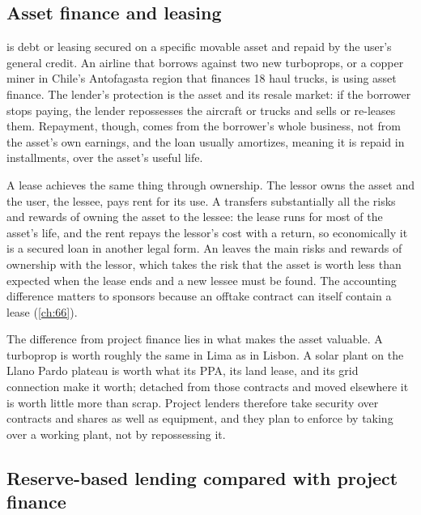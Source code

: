 \subsection{Asset finance and leasing}\label{ssec:2.4.2}

 is debt or leasing secured on a specific movable asset and repaid by the user's general credit. An airline that borrows against two new turboprops, or a copper miner in Chile's Antofagasta region that finances 18 haul trucks, is using asset finance. The lender's protection is the asset and its resale market: if the borrower stops paying, the lender repossesses the aircraft or trucks and sells or re-leases them. Repayment, though, comes from the borrower's whole business, not from the asset's own earnings, and the loan usually amortizes, meaning it is repaid in installments, over the asset's useful life.

A lease achieves the same thing through ownership. The lessor owns the asset and the user, the lessee, pays rent for its use. A  transfers substantially all the risks and rewards of owning the asset to the lessee: the lease runs for most of the asset's life, and the rent repays the lessor's cost with a return, so economically it is a secured loan in another legal form. An  leaves the main risks and rewards of ownership with the lessor, which takes the risk that the asset is worth less than expected when the lease ends and a new lessee must be found. The accounting difference matters to sponsors because an offtake contract can itself contain a lease (\cref{ch:66}).

The difference from project finance lies in what makes the asset valuable. A turboprop is worth roughly the same in Lima as in Lisbon. A solar plant on the Llano Pardo plateau is worth what its PPA, its land lease, and its grid connection make it worth; detached from those contracts and moved elsewhere it is worth little more than scrap. Project lenders therefore take security over contracts and shares as well as equipment, and they plan to enforce by taking over a working plant, not by repossessing it.

\subsection{Reserve-based lending compared with project finance}\label{ssec:2.4.3}

